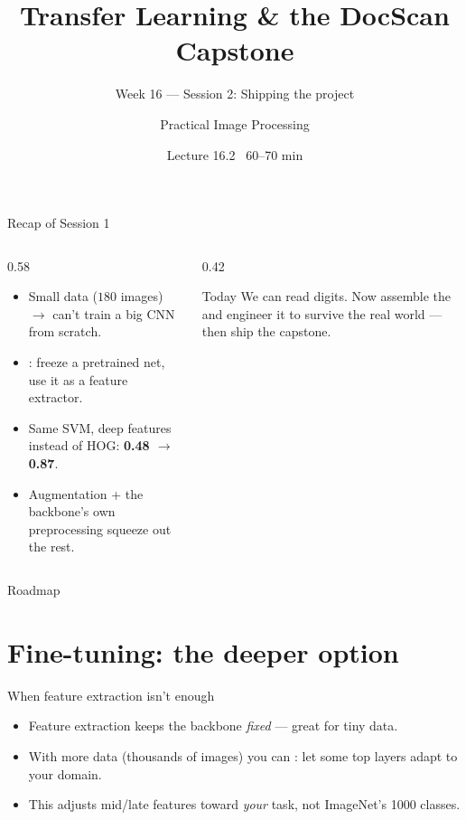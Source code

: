 \documentclass[10pt,aspectratio=169]{beamer}
\title{Transfer Learning \& the DocScan Capstone}
\subtitle{Week 16 — Session 2: Shipping the project}
\author{Practical Image Processing}
\date{Lecture 16.2 \textbullet\ 60--70 min}
\begin{document}
\maketitle

\begin{frame}{Recap of Session 1}
  \begin{columns}[T]
    \begin{column}{0.58\textwidth}
      \begin{itemize}
        \item Small data ($180$ images) $\rightarrow$ can't train a big CNN from scratch.
        \item {}: freeze a pretrained net, use it as a feature extractor.
        \item Same SVM, deep features instead of HOG: \textbf{0.48 $\rightarrow$ 0.87}.
        \item Augmentation + the backbone's own preprocessing squeeze out the rest.
      \end{itemize}
    \end{column}
    \begin{column}{0.42\textwidth}
      \begin{alertblock}{Today}
        We can read digits. Now assemble the  and engineer it
        to survive the real world — then ship the capstone.
      \end{alertblock}
    \end{column}
  \end{columns}
\end{frame}

\begin{frame}{Roadmap}\tableofcontents\end{frame}

\section{Fine-tuning: the deeper option}

\begin{frame}{When feature extraction isn't enough}
  \begin{itemize}
    \item Feature extraction keeps the backbone \emph{fixed} — great for tiny data.
    \item With more data (thousands of images) you can : let some top layers
          adapt to your domain.
    \item This adjusts mid/late features toward \emph{your} task, not ImageNet's 1000 classes.
  \end{itemize}
\end{frame}
\end{document}
